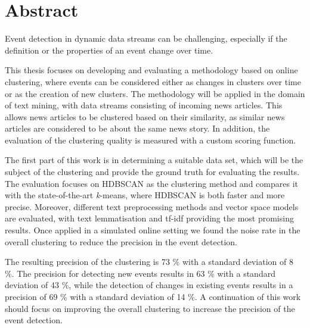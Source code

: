 
\section*{Abstract}



Event detection in dynamic data streams can be challenging, 
especially if the definition or the properties of an event change over time.

This thesis focuses on developing and evaluating a methodology based on online clustering, where events can be considered either as changes in clusters over time or as the creation of new clusters. 
The methodology will be applied in the domain of text mining, 
with data streams consisting of incoming news articles. 
This allows news articles to be clustered based on their similarity, 
as similar news articles are considered to be about the same news story. 
In addition, the evaluation of the clustering quality is measured with a custom scoring function.

The first part of this work is in determining a suitable data set, 
which will be the subject of the clustering and provide the ground truth for evaluating the results. 
The evaluation focuses on HDBSCAN as the clustering method and compares it with the state-of-the-art \textit{k}-means, 
where HDBSCAN is both faster and more precise. 
Moreover, different text preprocessing methods and vector space models are evaluated, with text lemmatisation and tf-idf providing the most promising results. 
Once applied in a simulated online setting we found the noise rate in the overall clustering to reduce the precision in the event detection.

The resulting precision of the clustering is 73 \% with a standard deviation of 8 \%. 
The precision for detecting new events results in 63 \% with a standard deviation of 43 \%, 
while the detection of changes in existing events results in a precision of 69 \% with a standard deviation of 14 \%. 
A continuation of this work should focus on improving the overall clustering to increase the precision of the event detection.